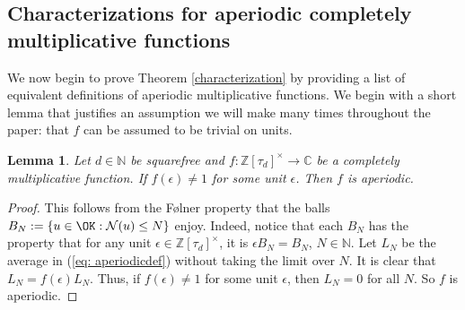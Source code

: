 \documentclass[11pt]{amsart}
\newtheorem{lemma}{Lemma}[section]
\theoremstyle{definition}
\newcommand{\C}{{\mathbb C}}
\newcommand{\N}{{\mathbb N}}
\newcommand{\NN}{{\mathcal N}}
\newcommand{\Z}{{\mathbb Z}}
\newcommand{\e}{\epsilon}
\begin{document}
\fi

\subsection{Characterizations for aperiodic completely multiplicative functions}
 
We now begin to prove Theorem \ref{characterization} by providing a list of equivalent definitions of aperiodic multiplicative functions.
We begin with a short lemma that justifies an assumption we will make many times throughout the paper: that $f$ can be assumed to be trivial on units.
\begin{lemma}\label{tv}
    Let $d\in\N$ be squarefree and $f\colon \Z[\tau_{d}]^{\times}\to\C$ be a  completely multiplicative function. If $f(\e)\neq 1$ for some unit $\e$. Then $f$ is aperiodic.
 \end{lemma}
 \begin{proof}
 This follows from the F\o lner property that the balls $B_N:= \{ u \in \OK : \NN(u)\leq N\}$ enjoy. Indeed, notice that each $B_N$ has the property that for any unit $\e \in \Z[\tau_{d}]^{\times}$, it is $\e B_N=B_N$, $N \in \N$. %
Let $L_{N}$ be the average in (\ref{eq: aperiodicdef}) without taking the limit over $N$. It is clear that $L_{N}=f(\e) L_{N}$. Thus, if $f(\e)\neq 1$ for some unit $\e$, then $L_{N}=0$ for all $N$. So $f$ is aperiodic. 
 \end{proof}
\end{document}
